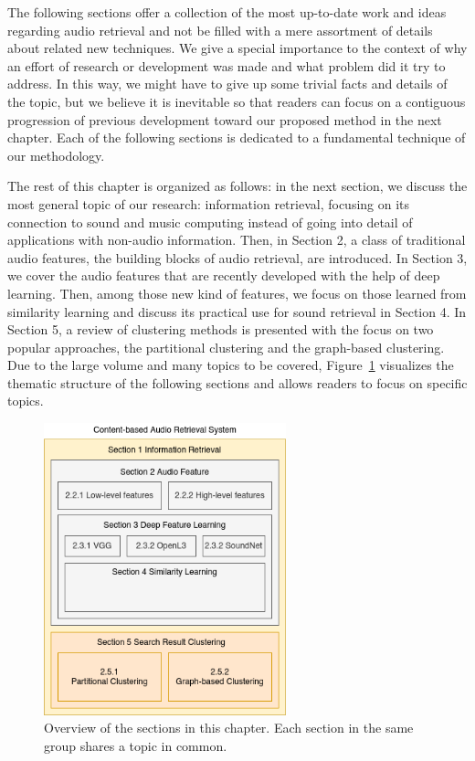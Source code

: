 The following sections offer a collection of the most up-to-date work and ideas regarding audio retrieval and not be filled with a mere assortment of details about related new techniques. We give a special importance to the context of why an effort of research or development was made and what problem did it try to address. In this way, we might have to give up some trivial facts and details of the topic, but we believe it is inevitable so that readers can focus on a contiguous progression of previous development toward our proposed method in the next chapter. Each of the following sections is dedicated to a fundamental technique of our methodology. 


The rest of this chapter is organized as follows: in the next section, we discuss the most general topic of our research: information retrieval, focusing on its connection to sound and music computing instead of going into detail of applications with non-audio information. Then, in Section 2, a class of traditional audio features, the building blocks of audio retrieval, are introduced. In Section 3, we cover the audio features that are recently developed with the help of deep learning. Then, among those new kind of features, we focus on those learned from similarity learning and discuss its practical use for sound retrieval in Section 4. In Section 5, a review of clustering methods is presented with the focus on two popular approaches, the partitional clustering and the graph-based clustering. Due to the large volume and many topics to be covered, Figure~\ref{toc-figrue} visualizes the thematic structure of the following sections and allows readers to focus on specific topics.

\begin{figure}[htb]
	\centering
	\includegraphics[width=7cm]{Figures/conceptual_relationship_of_sections.png}
	\caption{Overview of the sections in this chapter. Each section in the same group shares a topic in common.}
	\label{toc-figrue}
\end{figure}

